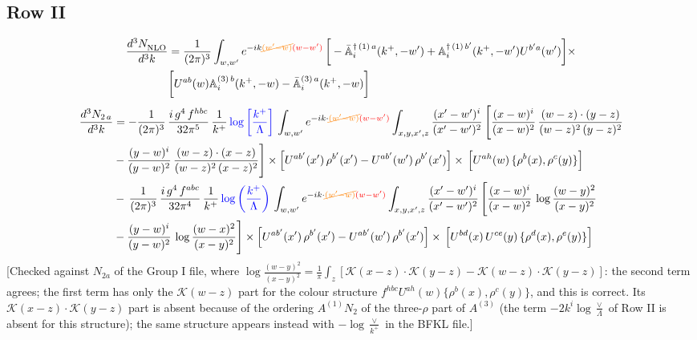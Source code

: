 \documentclass[9pt]{article}
\def\mf#1{\mathbb{#1}}
\numberwithin{equation}{section}
\begin{document}
\subsection{Row II}
\begin{align}
    \frac{d^{3}N_{\rm NLO}^{\rm}}{d^{3}k} &  = \frac{1}{(2\pi)^{3}}  \int_{w, w^\prime} e^{-ik{\color{orange}\cancel{(w^\prime-w)}}{\color{red}(w-w^\prime)}}\,\bigg[-\bar{\mf{A}}^{\dagger\,(1)\,a}_{i}(k^{+},-w^{\prime})+\mf{A}^{\dagger\, (1)\, b^{\prime}}_{i}(k^{+},-w^{\prime})U^{b^{\prime}a}(w^{\prime})\bigg]\times \notag \\ & \bigg[U^{ab}(w)\mf{A}^{(3)\, b}_{i}(k^{+},- w)-\Bar{\mf{A}}^{(3)\, a}_{i}(k^{+}, - w)\bigg]\nonumber
\end{align}
\begin{align}
    \frac{d^{3}N_{2\,a}}{d^{3}k} & = -\frac{1}{(2\pi)^{3}}\,\frac{i\,g^{4}\,f^{hbc}}{32\pi^{5}}\,\frac{1}{k^{+}}\,{\color{blue}\log{\left[\frac{k^{+}}{\Lambda}\right]}}\,
\int_{w,w'} e^{-ik\cdot{\color{orange}\cancel{(w'-w)}}{\color{red}(w-w')}}\int_{x,y,x',z}\frac{(x'-w')^{i}}{(x'-w')^{2}}\,\Bigg[\frac{(x-w)^{i}}{(x-w)^{2}}\, \frac{(w-z)\cdot (y-z)}{(w-z)^{2}\,(y-z)^{2}}\notag \\ & - \frac{(y-w)^{i}}{(y-w)^{2}}\, \frac{(w-z)\cdot (x-z)}{(w-z)^{2}\,(x-z)^{2}}\Bigg]\times\Big[U^{ab'}(x')\,\rho^{b'}(x')-U^{ab'}(w')\,\rho^{b'}(x')\Big]\times\, \Big[U^{ah}(w)\,\{\rho^{b}(x),\rho^{c}(y)\}\Big]\notag \\ &  -\,\frac{1}{(2\pi)^{3}}\,\frac{i\,g^{4}\,f^{abc}}{32\pi^{4}}\,\frac{1}{k^{+}}\,{\color{blue}\log\left(\frac{k^{+}}{\Lambda}\right)}\,
\int_{w,w'} e^{-ik\cdot{\color{orange}\cancel{(w'-w)}}{\color{red}(w-w')}}\int_{x,y,x',z}\frac{(x'-w')^{i}}{(x'-w')^{2}}\,\Bigg[\frac{(x-w)^{i}}{(x-w)^{2}}\,\log\frac{(w-y)^{2}}{(x-y)^{2}}\notag \\ & -\frac{(y-w)^{i}}{(y-w)^{2}}\,\log\frac{(w-x)^{2}}{(x-y)^{2}}\Bigg]\times \Big[U^{ab'}(x')\,\rho^{b'}(x')-U^{ab'}(w')\,\rho^{b'}(x')\Big]\times\, \Big[U^{bd}(x)\,U^{ce}(y)\,\{\rho^{d}(x),\rho^{e}(y)\}\Big]
\end{align} {\color{red}[Checked against $N_{2a}$ of the Group I file, where $\log\frac{(w-y)^{2}}{(x-y)^{2}}=\frac{1}{\pi}\int_{z}[\mathcal{K}(x-z)\cdot\mathcal{K}(y-z)-\mathcal{K}(w-z)\cdot\mathcal{K}(y-z)]$: the second term agrees; the first term has only the $\mathcal{K}(w-z)$ part for the colour structure $f^{hbc}U^{ah}(w)\{\rho^{b}(x),\rho^{c}(y)\}$, and this is correct. Its $\mathcal{K}(x-z)\cdot\mathcal{K}(y-z)$ part is absent because of the ordering $A^{(1)}N_{2}$ of the three-$\rho$ part of $A^{(3)}$ (the term $-2k^{i}\log\frac{\vee}{\Lambda}$ of Row II is absent for this structure); the same structure appears instead with $-\log\frac{\vee}{k^{+}}$ in the BFKL file.]}\par\noindent
\end{document}
